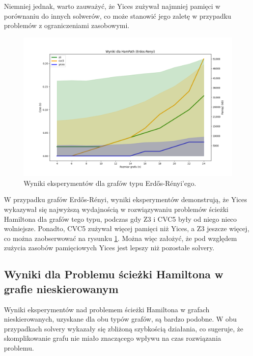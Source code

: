Niemniej jednak, warto zauważyć, że Yices zużywał najmniej pamięci w porównaniu do innych solwerów, co może stanowić jego zaletę w przypadku problemów z ograniczeniami zasobowymi.

\begin{figure}[htbp]
	\centering
	\begin{minipage}{\textwidth}
		\includegraphics[width=\textwidth]{./figures/1-erdos-renyi-plot.png}
		\caption{Wyniki eksperymentów dla grafów typu  Erdős-Rényi'ego.}
		\label{fig:1-erdos-renyi-plot}
	\end{minipage}
\end{figure}

W przypadku grafów Erdős-Rényi, wyniki eksperymentów demonstrują, że Yices wykazywał się najwyższą wydajnością w rozwiązywaniu problemów ścieżki Hamiltona dla grafów tego typu, podczas gdy Z3 i CVC5 były od niego nieco wolniejsze. Ponadto, CVC5 zużywał więcej pamięci niż Yices, a Z3 jeszcze więcej, co można zaobserwować na rysunku \ref{fig:1-erdos-renyi-plot}. Można więc założyć, że pod względem zużycia zasobów pamięciowych Yices jest lepszy niż pozostałe solvery.

\subsection{Wyniki dla Problemu ścieżki Hamiltona w grafie nieskierowanym}

Wyniki eksperymentów nad problemem ścieżki Hamiltona w grafach nieskierowanych, uzyskane dla obu typów grafów, są bardzo podobne. W obu przypadkach solvery wykazały się zbliżoną szybkością działania, co sugeruje, że skomplikowanie grafu nie miało znaczącego wpływu na czas rozwiązania problemu.


